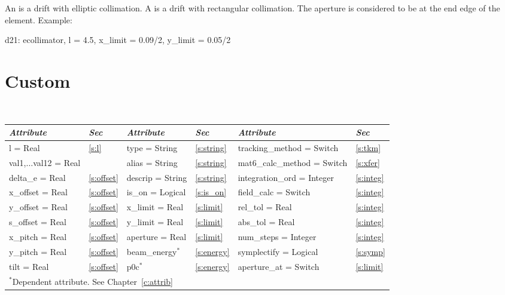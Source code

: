 An  is a drift with elliptic collimation.
A  is a drift with rectangular collimation.
The aperture is considered to be at the end edge of the element.
Example:
\begin{example}
  d21: ecollimator, l = 4.5, x_limit = 0.09/2, y_limit = 0.05/2
\end{example}

\section{Custom}
\label{s:custom}

\begin{center}
\tt
\begin{tabular}{|l|l||l|l||l|l|} \hline
  {\sl Attribute} & {\sl Sec}  & {\sl Attribute} & {\sl Sec}  & {\sl Attribute} & {\sl Sec} \\ \hline
  l        = Real           & \ref{s:l}      & type = String    & \ref{s:string} & tracking\_method = Switch   & \ref{s:tkm}   \\ \hline
  val1,$\ldots$val12 = Real &                & alias = String   & \ref{s:string} & mat6\_calc\_method = Switch & \ref{s:xfer}  \\ \hline
  delta\_e   = Real         & \ref{s:offset} & descrip = String & \ref{s:string} & integration\_ord = Integer  & \ref{s:integ} \\ \hline
  x\_offset  = Real         & \ref{s:offset} & is\_on = Logical & \ref{s:is_on}  & field\_calc = Switch        & \ref{s:integ} \\ \hline
  y\_offset  = Real         & \ref{s:offset} & x\_limit = Real  & \ref{s:limit}  & rel\_tol = Real             & \ref{s:integ} \\ \hline
  s\_offset  = Real         & \ref{s:offset} & y\_limit = Real  & \ref{s:limit}  & abs\_tol = Real             & \ref{s:integ} \\ \hline
  x\_pitch = Real           & \ref{s:offset} & aperture = Real  & \ref{s:limit}  & num\_steps = Integer        & \ref{s:integ} \\ \hline
  y\_pitch = Real           & \ref{s:offset} & beam\_energy$^*$ & \ref{s:energy} & symplectify = Logical       & \ref{s:symp}  \\ \hline
  tilt     = Real           & \ref{s:offset} & p0c$^*$          & \ref{s:energy} & aperture\_at = Switch       & \ref{s:limit} \\ \hline
  \multicolumn{6}{l}{\small $^*$Dependent attribute. See Chapter~\ref{c:attrib}} \\
\end{tabular}
\end{center}
\toffset

